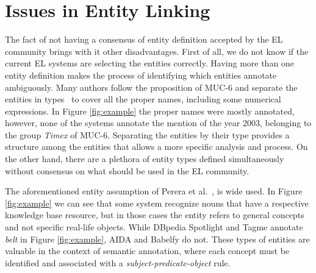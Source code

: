 \documentclass{llncs}
\begin{document}




\section{Issues in Entity Linking}

The fact of not having a consensus of entity definition accepted by the EL community brings with it other disadvantages. First of all, we do not know if the current EL systems are selecting the entities correctly. Having more than one entity definition makes the process of identifying which entities annotate ambiguously. Many authors follow the proposition of MUC-6 and separate the entities in types~\cite{meantime16,Fleischman001} to cover all the proper names, including some numerical expressions. In Figure \ref{fig:example} the proper names were mostly annotated, however, none of the systems annotate the mention of the year 2003, belonging to the group \textit{Timex} of MUC-6. Separating the entities by their type provides a structure among the entities that allows a more specific analysis and process. On the other hand, there are a plethora of entity types defined simultaneously without consensus on what should be used in the EL community.

The aforementioned entity assumption of Perera et al.~\cite{Perera16}, is wide used. In Figure \ref{fig:example} we can see that some system recognize nouns that have a respective knowledge base resource, but in those cases the entity refers to general concepts and not specific real-life objects. While DBpedia Spotlight and Tagme annotate \textit{belt} in Figure \ref{fig:example}, AIDA and Babelfy do not. These types of entities are valuable in the context of semantic annotation, where each concept must be identified and associated with a \textit{subject-predicate-object} rule. 
\end{document}
